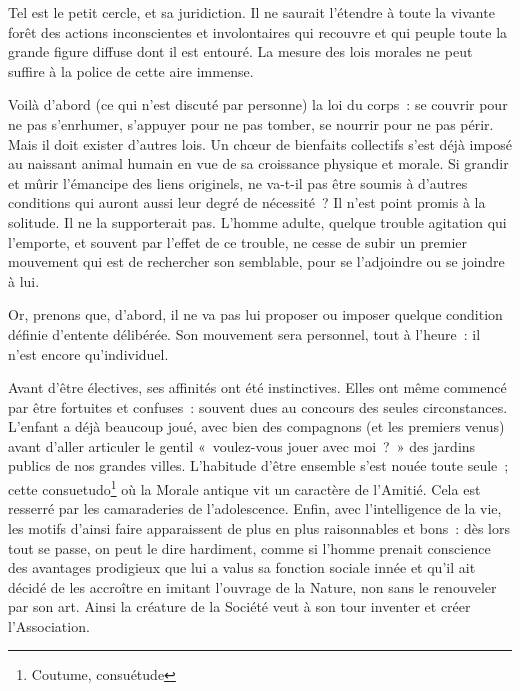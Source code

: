 \documentclass[french,twoside]{book} %
\begin{document}
Tel est le petit cercle, et sa juridiction. Il ne saurait l’étendre à toute la vivante forêt des actions inconscientes et involontaires qui recouvre et qui peuple toute la grande figure diffuse dont il est entouré. La mesure des lois morales ne peut suffire à la police de cette aire immense.\par
Voilà d’abord (ce qui n’est discuté par personne) la loi du corps : se couvrir pour ne pas s’enrhumer, s’appuyer pour ne pas tomber, se nourrir pour ne pas périr. Mais il doit exister d’autres lois. Un chœur de bienfaits collectifs s’est déjà imposé au naissant animal humain en vue de sa croissance physique et morale. Si grandir et mûrir l’émancipe des liens originels, ne va-t-il pas être soumis à d’autres conditions qui auront aussi leur degré de nécessité ? Il n’est point promis à la solitude. Il ne la supporterait pas. L’homme adulte, quelque trouble agitation qui l’emporte, et souvent par l’effet de ce trouble, ne cesse de subir un premier mouvement qui est de rechercher son semblable, pour se l’adjoindre ou se joindre à lui.\par
Or, prenons que, d’abord, il ne va pas lui proposer ou imposer quelque condition définie d’entente délibérée. Son mouvement sera personnel, tout à l’heure : il n’est encore qu’individuel.\par
Avant d’être électives, ses affinités ont été instinctives. Elles ont même commencé par être fortuites et confuses : souvent dues au concours des seules circonstances. L’enfant a déjà beaucoup joué, avec bien des compagnons (et les premiers venus) avant d’aller articuler le gentil « voulez-vous jouer avec moi ? » des jardins publics de nos grandes villes. L’habitude d’être ensemble s’est nouée toute seule ; cette consuetudo\footnote{Coutume, consuétude} où la Morale antique vit un caractère de l’Amitié. Cela est resserré par les camaraderies de l’adolescence. Enfin, avec l’intelligence de la vie, les motifs d’ainsi faire apparaissent de plus en plus raisonnables et bons : dès lors tout se passe, on peut le dire hardiment, comme si l’homme prenait conscience des avantages prodigieux que lui a valus sa fonction sociale innée et qu’il ait décidé de les accroître en imitant l’ouvrage de la Nature, non sans le renouveler par son art. Ainsi la créature de la Société veut à son tour inventer et créer l’Association.\par
\end{document}
